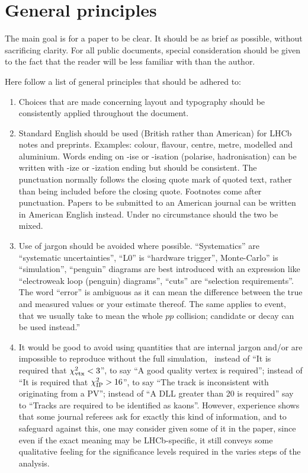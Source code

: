 \section{General principles}

The main goal is for a paper to be clear. It should be as brief as
possible, without sacrificing clarity. For all public documents,
special consideration should be given to the fact that the reader will
be less familiar with \lhcb than the author.

Here follow a list of general principles that should be adhered to:
\begin{enumerate}

\item Choices that are made concerning layout and typography
  should be consistently applied throughout the document.

\item Standard English should be used (British rather than American)
  for LHCb notes and preprints. Examples: colour, flavour, centre,
  metre, modelled and aluminium. Words ending on -ise or -isation
  (polarise, hadronisation) can be written with -ize or -ization ending but should be consistent.
  The punctuation normally follows the closing quote mark of quoted text, 
  rather than being included before the closing quote.
  Footnotes come after punctuation. 
  Papers to be submitted to an American journal can be written in American
  English instead. Under no circumstance should the two be mixed.

\item Use of jargon should be avoided where possible. ``Systematics'' are ``systematic
  uncertainties'', ``L0'' is ``hardware trigger'', Monte-Carlo'' is ``simulation'', ``penguin'' diagrams
  are best introduced with an expression like ``electroweak loop (penguin) diagrams'', ``cuts'' are ``selection requirements''. The word ``error'' is ambiguous as it can mean the difference between the true and measured values or your estimate thereof. The same applies to event, that we usually take to mean the whole $pp$ collision; candidate or decay can be used instead.''

\item It would be good to avoid using quantities that are internal jargon and/or 
  are impossible to reproduce without the full simulation, \ie\ instead of ``It is 
  required that $\chi^2_{\text{vtx}}<3$'', to say ``A good quality vertex is required''; 
  instead of ``It is required that $\chi^2_{\text{IP}}>16$'', to say ``The track is 
  inconsistent with originating from a PV''; instead of ``A DLL greater 
  than 20 is required'' say to ``Tracks are required to be identified as kaons''.
  However, experience shows that some journal referees ask for exactly this 
  kind of information, and to safeguard against this, one may consider given 
  some of it in the paper, since even if the exact meaning may be LHCb-specific, 
  it still conveys some qualitative feeling for the significance levels required 
  in the varies steps of the analysis.   
 

\end{enumerate}
